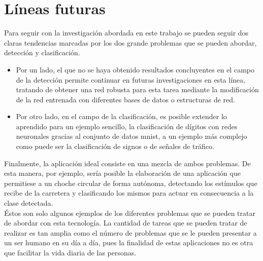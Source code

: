 \section{Líneas futuras}
Para seguir con la investigación abordada en este trabajo se pueden seguir dos claras tendencias marcadas por los dos grande problemas que se pueden abordar, detección y clasificación.
\begin{itemize}
	\item Por un lado, el que no se haya obtenido resultados concluyentes en el campo de la detección permite continuar en futuras investigaciones en esta línea, tratando de obtener una red robusta para esta tarea mediante la modificación de la red entrenada con diferentes bases de datos o estructuras de red.
	\item Por otro lado, en el campo de la clasificación, es posible extender lo aprendido para un ejemplo sencillo, la clasificación de dígitos con redes neuronales gracias al conjunto de datos \acrshort{mnist}, a un ejemplo más complejo como puede ser la clasificación de signos o de señales de tráfico.
\end{itemize}

Finalmente, la aplicación ideal consiste en una mezcla de ambos problemas. De esta manera, por ejemplo, sería posible la elaboración de una aplicación que permitiese a un choche circular de forma autónoma, detectando los estímulos que recibe de la carretera y clasificando los mismos para actuar en consecuencia a la clase detectada.\\

Éstos son solo algunos ejemplos de los diferentes problemas que se pueden tratar de abordar con esta tecnología. La cantidad de tareas que se pueden tratar de realizar es tan amplia como el número de problemas que se le pueden presentar a un ser humano en su día a día, pues la finalidad de estas aplicaciones no es otra que facilitar la vida diaria de las personas.